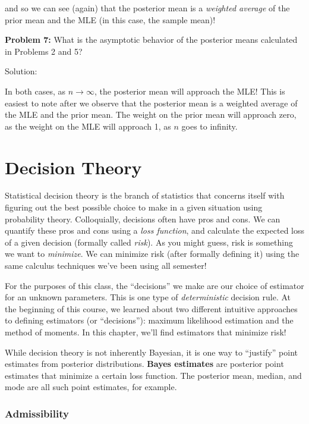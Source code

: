 \documentclass[
  letterpaper,
  DIV=11,
  numbers=noendperiod]{scrreprt}
\begin{document}
and so we can see (again) that the posterior mean is a \emph{weighted
average} of the prior mean and the MLE (in this case, the sample mean)!

\textbf{Problem 7:} What is the asymptotic behavior of the posterior
means calculated in Problems 2 and 5?

Solution:

In both cases, as \(n \to \infty\), the posterior mean will approach the
MLE! This is easiest to note after we observe that the posterior mean is
a weighted average of the MLE and the prior mean. The weight on the
prior mean will approach zero, as the weight on the MLE will approach 1,
as \(n\) goes to infinity.


\chapter{Decision Theory}\label{decision-theory}

Statistical decision theory is the branch of statistics that concerns
itself with figuring out the best possible choice to make in a given
situation using probability theory. Colloquially, decisions often have
pros and cons. We can quantify these pros and cons using a \emph{loss
function}, and calculate the expected loss of a given decision (formally
called \emph{risk}). As you might guess, risk is something we want to
\emph{minimize}. We can minimize risk (after formally defining it) using
the same calculus techniques we've been using all semester!

For the purposes of this class, the ``decisions'' we make are our choice
of estimator for an unknown parameters. This is one type of
\emph{deterministic} decision rule. At the beginning of this course, we
learned about two different intuitive approaches to defining estimators
(or ``decisions''): maximum likelihood estimation and the method of
moments. In this chapter, we'll find estimators that minimize risk!

While decision theory is not inherently Bayesian, it is one way to
``justify'' point estimates from posterior distributions. \textbf{Bayes
estimates} are posterior point estimates that minimize a certain loss
function. The posterior mean, median, and mode are all such point
estimates, for example.

\subsection*{Admissibility}\label{admissibility}
\end{document}
